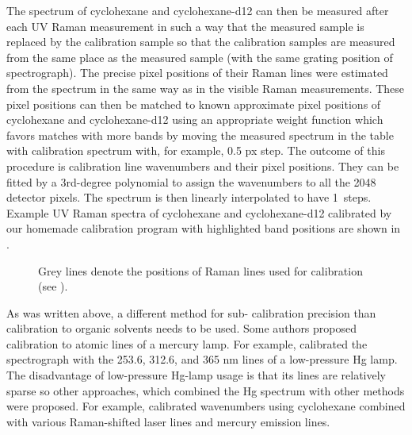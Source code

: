 \begin{table}
	\centering
	
	\caption[%
		Estimated wavenumbers $\tilde{\nu}$ of cyclohexane and cyclohexane-d12.%
	]{%
	}
	\label{\tablabel{wavenumber_calibration:cyclohexane_wavenumbers}}
\end{table}

The spectrum of cyclohexane and cyclohexane-d12 can then be measured after each
UV Raman measurement in such a way that the measured sample is replaced by the
calibration sample so that the calibration samples are measured from the same
place as the measured sample (with the same grating position of spectrograph).
The precise pixel positions of their Raman lines were estimated from the
spectrum in the same way as in the visible Raman measurements.
These pixel positions can then be matched to known approximate pixel positions
of cyclohexane and cyclohexane-d12 using an appropriate weight function which
favors matches with more bands by moving the measured spectrum in the table
with calibration spectrum with, for example, 0.5 px step.
The outcome of this procedure is calibration line wavenumbers and their pixel
positions.
They can be fitted by a 3rd-degree polynomial to assign the wavenumbers to all
the 2048 detector pixels.
The spectrum is then linearly interpolated to have 1\,\icm{} steps.
Example UV Raman spectra of cyclohexane and cyclohexane-d12 calibrated by our
homemade calibration program with highlighted band positions are shown in
.

\begin{figure}
	\centering
	
	\caption[%
		UV Raman spectrum of cyclohexane and cyclohexane-d12 with 244\,nm
		excitation.%
	]{%
		Grey lines denote the positions of Raman lines used for calibration (see
		).
	}
	\label{\figlabel{wavenumber_calibration:cyclohexane_spc}}
\end{figure}

As was written above, a different method for sub-\icm{} calibration precision
than calibration to organic solvents needs to be used.
Some authors proposed calibration to atomic lines of a mercury lamp.
For example,
\textcite{%
	Manoharan1990,%
	Efremov1991%
}
calibrated the spectrograph with the 253.6, 312.6, and 365 nm lines of a
low-pressure Hg lamp.
The disadvantage of low-pressure Hg-lamp usage is that its lines are relatively
sparse so other approaches, which combined the Hg spectrum with other methods
were proposed.
For example, \textcite{Myers1988} calibrated wavenumbers using cyclohexane
combined with various  Raman-shifted laser lines and mercury emission
lines.

